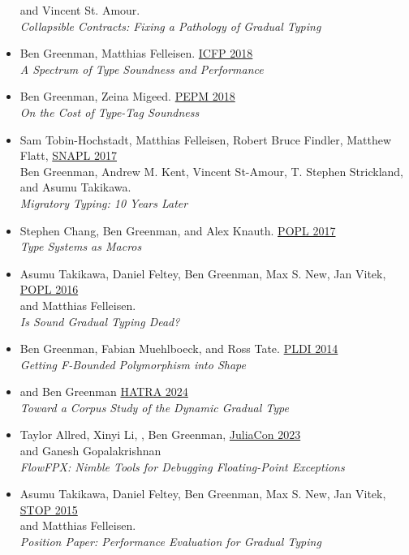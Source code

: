 \documentclass[11pt]{article}
\begin{document}
\begin{itemize}
  and Vincent St. Amour. \\
  \emph{Collapsible Contracts: Fixing a Pathology of Gradual Typing} \hfill {}
\item
  Ben Greenman, Matthias Felleisen. \hfill \href{https://icfp18.sigplan.org/}{ICFP 2018} \\
  \emph{A Spectrum of Type Soundness and Performance} \hfill {}
\item
  Ben Greenman, Zeina Migeed. \hfill \href{https://popl18.sigplan.org/track/PEPM-2018}{PEPM 2018} \\
  \emph{On the Cost of Type-Tag Soundness} \hfill {} %
\item
  Sam Tobin-Hochstadt, Matthias Felleisen, Robert Bruce Findler, Matthew Flatt, \hfill \href{https://snapl.org/2017/}{SNAPL 2017} \\
  Ben Greenman, Andrew M. Kent, Vincent St-Amour, T. Stephen Strickland, \\
  and Asumu Takikawa. \\
  \emph{Migratory Typing: 10 Years Later} \hfill {}
\item
  Stephen Chang, Ben Greenman, and Alex Knauth. \hfill \href{https://popl17.sigplan.org/}{POPL 2017} \\
   \emph{Type Systems as Macros} \hfill {}
\item
  Asumu Takikawa, Daniel Feltey, Ben Greenman, Max S. New, Jan Vitek, \hfill \href{https://popl16.sigplan.org/}{POPL 2016} \\
   and Matthias Felleisen. \\
   \emph{Is Sound Gradual Typing Dead?} \hfill {} %
\item
  Ben Greenman, Fabian Muehlboeck, and Ross Tate. \hfill \href{https://conferences.inf.ed.ac.uk/pldi2014/}{PLDI 2014} \\
  \emph{Getting F-Bounded Polymorphism into Shape} \hfill {}
\end{itemize}

\begin{itemize}
  \item
     and Ben Greenman \hfill \href{https://2024.splashcon.org/home/hatra-2024}{HATRA 2024} \\
      \emph{Toward a Corpus Study of the Dynamic Gradual Type}
  \item
    Taylor Allred, Xinyi Li, , Ben Greenman, \hfill \href{https://juliacon.org/2023/}{JuliaCon 2023} \\
     and Ganesh Gopalakrishnan  \\
     \emph{FlowFPX: Nimble Tools for Debugging Floating-Point Exceptions}
  \item
    Asumu Takikawa, Daniel Feltey, Ben Greenman, Max S. New, Jan Vitek, \hfill \href{https://2015.ecoop.org/track/STOP2015}{STOP 2015} \\
     and Matthias Felleisen. \\
     \emph{Position Paper: Performance Evaluation for Gradual Typing}
\end{itemize}
\end{document}
